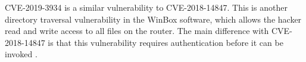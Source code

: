 CVE-2019-3934 is a similar vulnerability to CVE-2018-14847. This is another directory traversal vulnerability in the WinBox software, which allows the hacker read and write access to all files on the router. The main difference with CVE-2018-14847 is that this vulnerability requires authentication before it can be invoked  \cite{CVE-2019-3943:TENABLE:2019}.